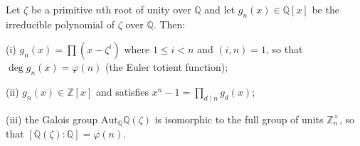 Let $\zeta$ be a primitive $n$th root of unity over $\mathbb{Q}$ and let $g_n(x) \in \mathbb{Q}[x]$ be the irreducible polynomial of $\zeta$ over $\mathbb{Q}$. Then:

(i) $g_n(x) = \prod (x - \zeta^i)$ where $1 \leq i < n$ and $(i,n) = 1$, so that $\deg g_n(x) = \varphi(n)$ (the Euler totient function);

(ii) $g_n(x) \in \mathbb{Z}[x]$ and satisfies $x^n - 1 = \prod_{d \mid n} g_d(x)$;

(iii) the Galois group $\mathrm{Aut}_{\mathbb{Q}} \mathbb{Q}(\zeta)$ is isomorphic to the full group of units $\mathbb{Z}_n^\times$, so that $[\mathbb{Q}(\zeta) : \mathbb{Q}] = \varphi(n)$.
